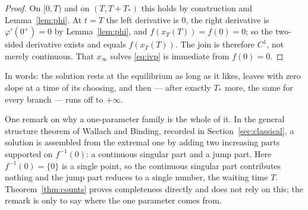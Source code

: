 \documentclass[12pt]{article}
\theoremstyle{plain}
\theoremstyle{definition}
\theoremstyle{remark}
\begin{document}
\begin{proof}
On $[0,T)$ and on $(T,T+T_{*})$ this holds by construction and
Lemma~\ref{lem:phi}. At $t=T$ the left derivative is $0$, the right derivative
is $\varphi'(0^{+})=0$ by Lemma~\ref{lem:phi}, and $f(x_{T}(T))=f(0)=0$; so the
two-sided derivative exists and equals $f(x_{T}(T))$. The join is therefore
$C^{1}$, not merely continuous. That $x_{\infty}$ solves \eqref{eq:ivp} is
immediate from $f(0)=0$.
\end{proof}

In words: the solution rests at the equilibrium as long as it likes, leaves with
zero slope at a time of its choosing, and then --- after exactly
$T_{*}$ more, the same for every branch --- runs off to $+\infty$.

One remark on why a one-parameter family is the whole of it. In the general
structure theorem of Wallach and Binding, recorded in
Section~\ref{sec:classical}, a solution is assembled from the extremal one by
adding two increasing parts supported on $f^{-1}(0)$: a continuous singular part
and a jump part. Here $f^{-1}(0)=\{0\}$ is a single point, so the continuous
singular part contributes nothing and the jump part reduces to a single number,
the waiting time $T$. Theorem~\ref{thm:counts} proves completeness directly and
does not rely on this; the remark is only to say where the one parameter comes
from.
\end{document}
